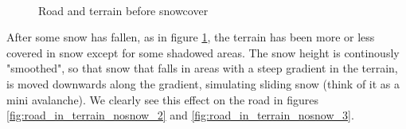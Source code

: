 \begin{figure}[ht]
\centering
{}\\
\quad
{}
\caption{Road and terrain before snowcover}
\label{fig:road_in_terrain_nosnow}
\end{figure}

After some snow has fallen, as in figure \ref{fig:road_in_terrain_nosnow}, the terrain has been more or less covered in snow except for some shadowed areas. The snow height is continously "smoothed", so that snow that falls in areas with a steep gradient in the terrain, is moved downwards along the gradient, simulating sliding snow (think of it as a mini avalanche). We clearly see this effect on the road in figures \ref{fig:road_in_terrain_nosnow_2} and \ref{fig:road_in_terrain_nosnow_3}.

